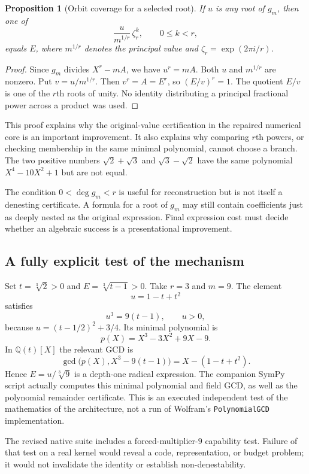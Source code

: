 \documentclass[11pt,letterpaper]{article}
\newcommand{\code}[1]{\texttt{#1}}
\newcommand{\Q}{\mathbb Q}
\newtheorem{proposition}{Proposition}[section]
\theoremstyle{definition}
\begin{document}
\begin{proposition}[Orbit coverage for a selected root]\label{prop:orbit}
If $u$ is any root of $g_m$, then one of
\[
 \frac{u}{m^{1/r}}\,\zeta_r^k,\qquad 0\le k<r,
\]
equals $E$, where $m^{1/r}$ denotes the principal value and $\zeta_r=\exp(2\pi i/r)$.
\end{proposition}
\begin{proof}
Since $g_m$ divides $X^r-mA$, we have $u^r=mA$. Both $u$ and $m^{1/r}$ are nonzero. Put $v=u/m^{1/r}$. Then $v^r=A=E^r$, so $(E/v)^r=1$. The quotient $E/v$ is one of the $r$th roots of unity. No identity distributing a principal fractional power across a product was used.
\end{proof}

This proof explains why the original-value certification in the repaired numerical core is an important improvement. It also explains why comparing $r$th powers, or checking membership in the same minimal polynomial, cannot choose a branch. The two positive numbers $\sqrt2+\sqrt3$ and $\sqrt3-\sqrt2$ have the same polynomial $X^4-10X^2+1$ but are not equal.

The condition $0<\deg g_m<r$ is useful for reconstruction but is not itself a denesting certificate. A formula for a root of $g_m$ may still contain coefficients just as deeply nested as the original expression. Final expression cost must decide whether an algebraic success is a presentational improvement.

\subsection{A fully explicit test of the mechanism}

Set $t=\sqrt[3]2>0$ and $E=\sqrt[3]{t-1}>0$. Take $r=3$ and $m=9$. The element
\[
 u=1-t+t^2
\]
satisfies
\[
 u^3=9(t-1),\qquad u>0,
\]
because $u=(t-1/2)^2+3/4$. Its minimal polynomial is
\[
 p(X)=X^3-3X^2+9X-9.
\]
In $\Q(t)[X]$ the relevant GCD is
\[
 \gcd\bigl(p(X),X^3-9(t-1)\bigr)=X-(1-t+t^2).
\]
Hence $E=u/\sqrt[3]9$ is a depth-one radical expression. The companion SymPy script actually computes this minimal polynomial and field GCD, as well as the polynomial remainder certificate. This is an executed independent test of the mathematics of the architecture, not a run of Wolfram's \code{PolynomialGCD} implementation.

The revised native suite includes a forced-multiplier-$9$ capability test. Failure of that test on a real kernel would reveal a code, representation, or budget problem; it would not invalidate the identity or establish non-denestability.
\end{document}
